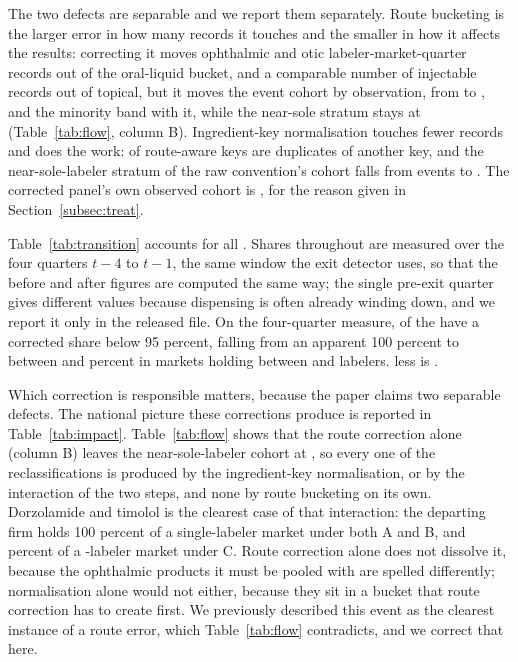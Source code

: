 \documentclass[pdflatex,sn-vancouver-num,Numbered]{sn-jnl}
\begin{document}
The two defects are separable and we report them separately. Route bucketing is the larger
error in how many records it touches and the smaller in how it affects the results: correcting
it moves \nOphthRecords ophthalmic and \nOticRecords otic labeler-market-quarter records out of the oral-liquid
bucket, and a comparable number of injectable records out of topical, but it moves the event
cohort by \nRouteCohortDelta observation, from \nSpecAObs to \nSpecBObs, and the minority band
with it, while the near-sole stratum stays at \nRawSole (Table~\ref{tab:flow}, column B). Ingredient-key
normalisation touches fewer records and does the work: \nKeysAbsorbed of \nRawKeys route-aware keys are
duplicates of another key, and the near-sole-labeler stratum of the raw convention's cohort
falls from \nRawSoleW events to \nRemainSoleW. The corrected panel's own observed cohort is
\nTreated, for the reason given in Section~\ref{subsec:treat}.

Table~\ref{tab:transition} accounts for all \nRawSoleW. Shares throughout are measured over the four
quarters $t-4$ to $t-1$, the same window the exit detector uses, so that the before and after
figures are computed the same way; the single pre-exit quarter gives different values because
dispensing is often already winding down, and we report it only in the released file. On the
four-quarter measure, \nReclassSoleW of the \nRawSoleW have a corrected share below 95 percent, falling from
an apparent 100 percent to between \nTransShareLo and \nTransShareHi percent in markets holding
between \nTransLabLo and \nTransLabHi labelers. \nRawSoleUC less \nReclassSoleW is \nRemainSoleW.

Which correction is responsible matters, because the paper claims two separable defects.
The national picture these corrections produce is reported in Table~\ref{tab:impact}. Table~\ref{tab:flow} shows that the route correction alone (column B) leaves the near-sole-labeler
cohort at \nRawSoleW, so every one of the \nReclassSoleW reclassifications is produced by the ingredient-key
normalisation, or by the interaction of the two steps, and none by route bucketing on its own.
Dorzolamide and timolol is the clearest case of that interaction: the departing firm holds 100
percent of a single-labeler market under both A and B, and \nDorzShare percent of a \nDorzLabelersW-labeler market
under C. Route correction alone does not dissolve it, because the ophthalmic products it must be
pooled with are spelled differently; normalisation alone would not either, because they sit in a
bucket that route correction has to create first. We previously described this event as the
clearest instance of a route error, which Table~\ref{tab:flow} contradicts, and we correct that
here.
\end{document}
